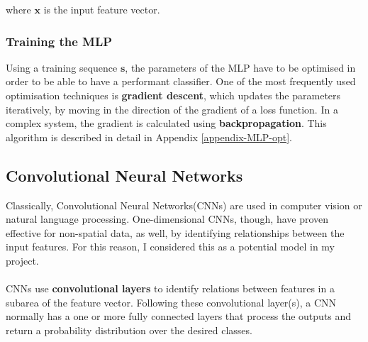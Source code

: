 	where $\mathbf{x}$ is the input feature vector.
	
	\subsubsection*{Training the MLP}
	Using a training sequence $\mathbf{s}$, the parameters of the MLP have to be optimised in order to be able to have a performant classifier. One of the most frequently used optimisation techniques is \textbf{gradient descent}, which updates the parameters iteratively, by moving in the direction of the gradient of a loss function. In a complex system, the gradient is calculated using \textbf{backpropagation}. This algorithm is described in detail in Appendix \ref{appendix-MLP-opt}. 
	
	\subsection{Convolutional Neural Networks} 
	Classically, Convolutional Neural Networks(CNNs) are used in computer vision or natural language processing. One-dimensional CNNs, though, have proven effective for non-spatial data, as well, by identifying relationships between the input features. For this reason, I considered this as a potential model in my project. 
	\\ \\
	CNNs use \textbf{convolutional layers} to identify relations between features in a subarea of the feature vector. Following these convolutional layer(s), a CNN normally has a one or more fully connected layers that process the outputs and return a probability distribution over the desired classes.  
	
